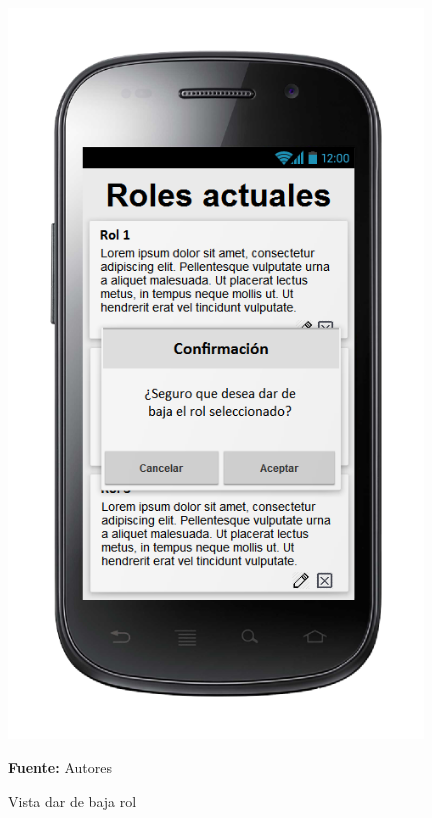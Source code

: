 \begin{figure}[!htb]
  \begin{center}
\includegraphics[width=11cm]{./imagenes/UI/Administracion/dar_de_baja_rol.png}
    \caption{Vista dar de baja rol}
    \label{fig:Vista_dar_de_baja_rol}
    \textbf{Fuente:}  Autores
  \end{center}
\end{figure}
